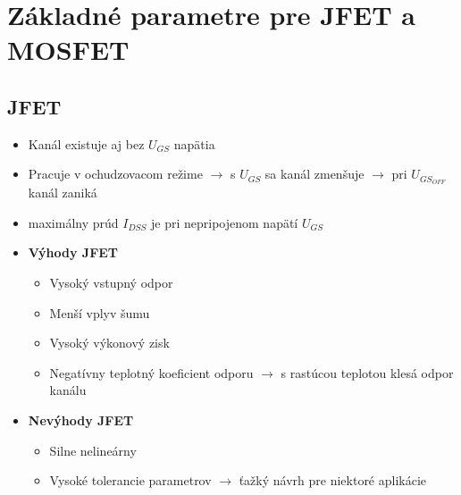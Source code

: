 \section{Základné parametre pre JFET a MOSFET}
\subsection{JFET}
\begin{itemize}
\item Kanál existuje aj bez $U_{GS}$ napätia
\item Pracuje v ochudzovacom režime $\rightarrow$ s $U_{GS}$ sa kanál zmenšuje $\rightarrow$ pri $U_{GS_{OFF}}$ kanál zaniká
\item maximálny prúd $I_{DSS}$ je pri nepripojenom napätí $U_{GS}$
\item \textbf{Výhody JFET}
\begin{itemize}
	\item Vysoký vstupný odpor
	\item Menší vplyv šumu
	\item Vysoký výkonový zisk
	\item Negatívny teplotný koeficient odporu $\rightarrow$ s rastúcou teplotou klesá odpor kanálu
\end{itemize}
\item \textbf{Nevýhody JFET}
\begin{itemize}
	\item Silne nelineárny
	\item Vysoké tolerancie parametrov $\rightarrow$ ťažký návrh pre niektoré aplikácie
\end{itemize}
\end{itemize}
